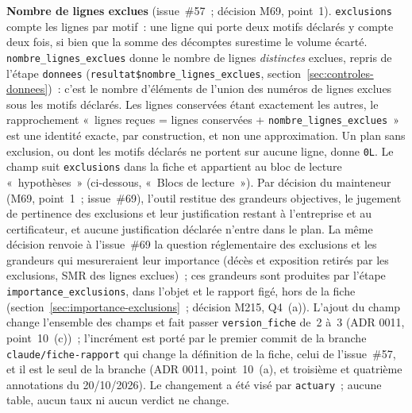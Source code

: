 \documentclass[a4paper,11pt]{article}
\newcommand{\code}[1]{\texttt{\small #1}}
\begin{document}
\medskip
\noindent
\textbf{Nombre de lignes exclues} (issue~\#57~; décision M69, point~1).
\code{exclusions} compte les lignes par motif~: une ligne qui porte deux
motifs déclarés y compte deux fois, si bien que la somme des décomptes
surestime le volume écarté. \code{nombre\_lignes\_exclues} donne le nombre de
lignes \emph{distinctes} exclues, repris de l'étape \code{donnees}
(\code{resultat\$nombre\_lignes\_exclues}, section~\ref{sec:controles-donnees})~:
c'est le nombre d'éléments de l'union des numéros de lignes exclues sous
les motifs déclarés. Les lignes conservées étant exactement les autres, le
rapprochement «~lignes reçues = lignes conservées +
\code{nombre\_lignes\_exclues}~» est une identité exacte, par
construction, et non une approximation. Un plan sans exclusion, ou dont les
motifs déclarés ne portent sur aucune ligne, donne \code{0L}. Le champ suit
\code{exclusions} dans la fiche et appartient au bloc de lecture
«~hypothèses~» (ci-dessous, «~Blocs de lecture~»). Par décision du
mainteneur (M69, point~1~; issue~\#69), l'outil restitue des grandeurs
objectives, le jugement de pertinence des exclusions et leur justification
restant à l'entreprise et au certificateur, et aucune justification déclarée
n'entre dans le plan. La même décision renvoie à l'issue~\#69 la question
réglementaire des exclusions et les grandeurs qui mesureraient leur
importance (décès et exposition retirés par les exclusions, SMR des lignes
exclues)~; ces grandeurs sont produites par l'étape
\code{importance\_exclusions}, dans l'objet et le rapport figé, hors de la
fiche (section~\ref{sec:importance-exclusions}~; décision M215, Q4~(a)).
L'ajout du champ change l'ensemble
des champs et fait passer \code{version\_fiche} de~2 à~3 (ADR 0011,
point~10~(c))~; l'incrément est porté par le premier commit de la branche
\code{claude/fiche-rapport} qui change la définition de la fiche, celui de
l'issue~\#57, et il est le seul de la branche (ADR 0011, point~10~(a), et
troisième et quatrième annotations du 20/10/2026). Le changement a été visé
par \code{actuary}~; aucune table, aucun taux ni aucun verdict ne change.
\end{document}

